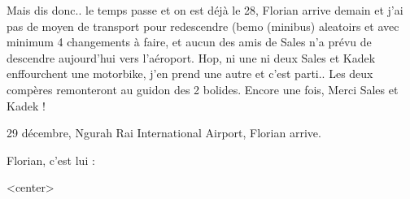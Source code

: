 \begin{multicols}{2}


Mais dis donc.. le temps passe et on est déjà le 28, Florian arrive demain et j'ai pas de moyen de transport pour redescendre (bemo (minibus) aleatoirs et avec minimum 4 changements à faire, et aucun des amis de Sales n'a prévu de descendre aujourd'hui vers l'aéroport. Hop, ni une ni deux Sales et Kadek enffourchent une motorbike, j'en prend une autre et c'est parti.. Les deux compères remonteront au guidon des 2 bolides. Encore une fois, Merci Sales et Kadek !

29 décembre, Ngurah Rai International Airport, Florian arrive.

Florian, c'est lui :

<center>%

\end{multicols}


